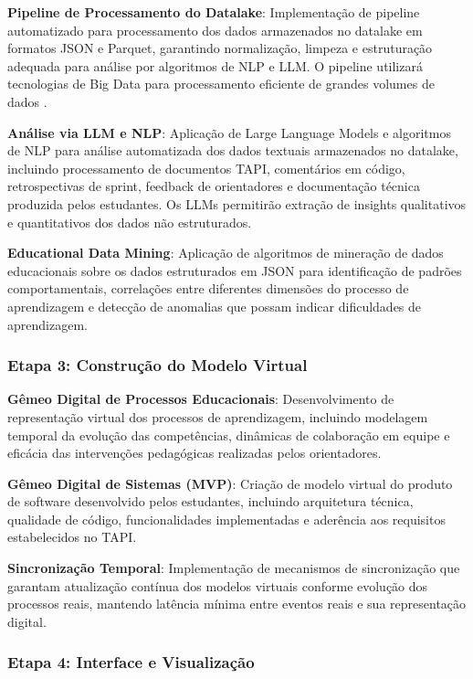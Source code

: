 \documentclass[12pt, a4paper, oneside]{abntex2}
\begin{document}
\textbf{Pipeline de Processamento do Datalake}: Implementação de pipeline automatizado para processamento dos dados armazenados no datalake em formatos JSON e Parquet, garantindo normalização, limpeza e estruturação adequada para análise por algoritmos de NLP e LLM. O pipeline utilizará tecnologias de Big Data para processamento eficiente de grandes volumes de dados \cite{romero2020}.

\textbf{Análise via LLM e NLP}: Aplicação de Large Language Models e algoritmos de NLP para análise automatizada dos dados textuais armazenados no datalake, incluindo processamento de documentos TAPI, comentários em código, retrospectivas de sprint, feedback de orientadores e documentação técnica produzida pelos estudantes. Os LLMs permitirão extração de insights qualitativos e quantitativos dos dados não estruturados.

\textbf{Educational Data Mining}: Aplicação de algoritmos de mineração de dados educacionais \cite{romero2010} sobre os dados estruturados em JSON para identificação de padrões comportamentais, correlações entre diferentes dimensões do processo de aprendizagem e detecção de anomalias que possam indicar dificuldades de aprendizagem.

\subsubsection{Etapa 3: Construção do Modelo Virtual}

\textbf{Gêmeo Digital de Processos Educacionais}: Desenvolvimento de representação virtual dos processos de aprendizagem, incluindo modelagem temporal da evolução das competências, dinâmicas de colaboração em equipe e eficácia das intervenções pedagógicas realizadas pelos orientadores.

\textbf{Gêmeo Digital de Sistemas (MVP)}: Criação de modelo virtual do produto de software desenvolvido pelos estudantes, incluindo arquitetura técnica, qualidade de código, funcionalidades implementadas e aderência aos requisitos estabelecidos no TAPI.

\textbf{Sincronização Temporal}: Implementação de mecanismos de sincronização que garantam atualização contínua dos modelos virtuais conforme evolução dos processos reais, mantendo latência mínima entre eventos reais e sua representação digital.

\subsubsection{Etapa 4: Interface e Visualização}
\end{document}
